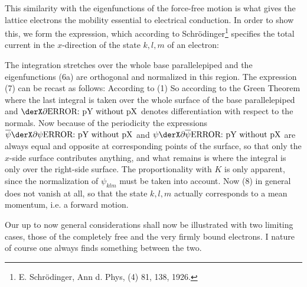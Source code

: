 \begin{paper}{1}
This similarity with the eigenfunctions of the force-free motion is what gives the lattice electrons the mobility essential to electrical conduction. In order to show this, we form the expression, which according to Schr\"odinger\footnote{E. Schr\"odinger, Ann d. Phys, (4) 81, 138, 1926.} specifies the total current in the $x$-direction of the state $k,l,m$ of an electron:

The integration stretches over the whole base parallelepiped and the eigenfunctions (6a) are orthogonal and normalized in this region. The expression (7) can be recast as follows: According to (1)
So according to the Green Theorem
where the last integral is taken over the whole surface of the base parallelepiped and $\pX{}\pY{n}$ denotes differentiation with respect to the normals. Now because of the periodicity the expressions $\overline\psi\pX\psi\pY{n}$ and $\psi\pX{\overline\psi}\pY{n}$ are always equal and opposite at corresponding points of the surface, so that only the $x$-side surface contributes anything, and what remains is
where the integral is only over the right-side surface. The proportionality with $K$ is only apparent, since the normalization of $\psi_{klm}$ must be taken into account. Now (8) in general does not vanish at all, so that the state $k,l,m$ actually corresponds to a mean momentum, i.e. a forward motion.

Our up to now general considerations shall now be illustrated with two limiting cases, those of the completely free and the very firmly bound electrons. I nature of course one always finds something between the two.


\end{paper}
